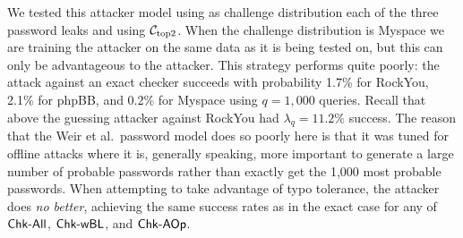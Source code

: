 We tested this attacker model using as challenge distribution each of the three
password leaks and using ${\mathcal C}_{\textrm{top2}}$. When the challenge distribution is Myspace we are training the
attacker on the same data as it is being tested on, but this can only be
advantageous to the attacker.
This strategy performs quite poorly: the attack against an exact checker
succeeds with probability 1.7\% for RockYou, 2.1\% for phpBB, and 0.2\% for
Myspace using $q = 1,000$ queries.   Recall that above the 
guessing attacker against RockYou had $\lambda_q = 11.2\%$ success. The reason that the Weir et
al.~password model does so poorly here is that it was tuned for offline attacks
where it is, generally speaking, more important to generate a large number of
probable passwords rather than exactly get the 1,000 most probable passwords. 
When attempting to take
advantage of typo tolerance, the attacker does \emph{no better}, achieving
the same success rates as in the exact case for any of
$\textnormal{\textsf{Chk-All}}$, $\textnormal{\textsf{Chk-wBL}}$, and $\textnormal{\textsf{Chk-AOp}}$. 
\fi


